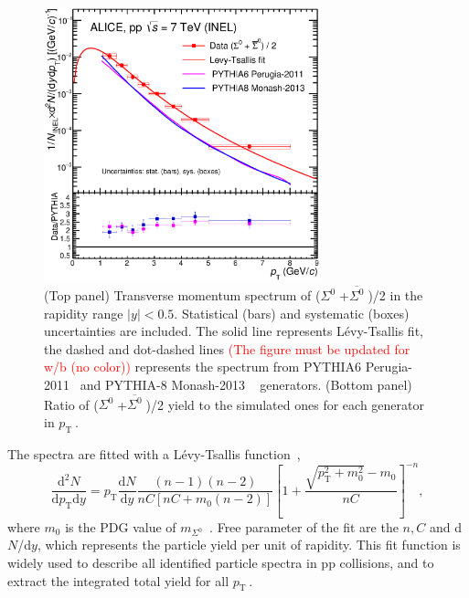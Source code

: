 \documentclass[ALICE,manyauthors]{cernphprep}
\newcommand{\dndy}{d$N$/d$y$\;}
\newcommand{\sig}{\ensuremath{\Sigma^0  \; }}
\newcommand{\asig}{\ensuremath{\overline{\Sigma^0} \; }}
\newcommand{\pt}{\ensuremath{p_{\mathrm{T}\; }}}
\newcommand{\red}{\textcolor{red}}
\begin{document}
\begin{figure}[h!]
\centering
 \includegraphics[width=8.0cm]{Figure/CM-6feb18-Data-LTfit-Pyt6-Pyt8.eps}

  \caption{(Top panel) Transverse momentum spectrum of (\sig+\asig)/2 in  the rapidity range $|y|<0.5$. 
  Statistical (bars) and systematic (boxes) uncertainties are included. The solid line
  represents L\'{e}vy-Tsallis fit, the dashed and dot-dashed lines \red{(The figure must be updated for w/b (no color))} 
  represents the spectrum from PYTHIA6 Perugia-2011~\cite{cite:pythia6} and PYTHIA-8 Monash-2013
  ~\cite{cite:PYTHIA-8-Monash-gener} generators.
  (Bottom panel) Ratio of (\sig+\asig)/2 yield to the simulated ones for each generator in \pt.
  }
 \label{fig:spectra}
\end{figure}

The spectra are fitted with a L\'{e}vy-Tsallis function~\cite{cite:Tsallis}, 
\begin{equation}
\frac{\mathrm{d}^2N}{\mathrm{d}p_{\mathrm{T}}\mathrm{d}y} = p_{\mathrm{T}} 
\frac{\mathrm{d}N}{\mathrm{d}y} \frac{(n-1)(n-2)}{nC[nC+m_{0}(n-2)]}\left[1+
\frac{\sqrt{p_{\mathrm{T}}^2+m_{0}^{2}}-m_{0}}{nC}\right]^{-n},
\label{eqn:funclevy}
\end{equation}
where $m_0$ is the PDG value of $m_{\Sigma^0}$~\cite{cite:PDG}. Free parameter of the fit are the $n, C$ and \dndy, which represents 
the particle yield per unit of rapidity. This fit function is widely used to describe all identified particle spectra in pp 
collisions\cite{cite:Xi_pp,cite:KphipPb, cite:lambda_pp}, and to extract the integrated total yield for all \pt.
\end{document}
